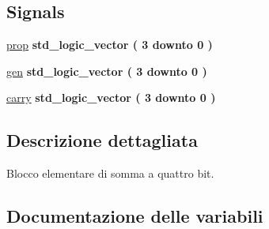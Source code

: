 \subsection*{Signals}
 \begin{DoxyCompactItemize}
\item 
\hyperlink{group___nibble_adder_ga3abd8d433ff039baabc0c6fc2126578b}{prop} {\bfseries \textcolor{vhdlchar}{std\+\_\+logic\+\_\+vector}\textcolor{vhdlchar}{ }\textcolor{vhdlchar}{(}\textcolor{vhdlchar}{ }\textcolor{vhdlchar}{ } \textcolor{vhdldigit}{3} \textcolor{vhdlchar}{ }\textcolor{vhdlchar}{downto}\textcolor{vhdlchar}{ }\textcolor{vhdlchar}{ } \textcolor{vhdldigit}{0} \textcolor{vhdlchar}{ }\textcolor{vhdlchar}{)}\textcolor{vhdlchar}{ }} 
\item 
\hyperlink{group___nibble_adder_gac6c069fe4ec1c0a42272d3de4be6f45f}{gen} {\bfseries \textcolor{vhdlchar}{std\+\_\+logic\+\_\+vector}\textcolor{vhdlchar}{ }\textcolor{vhdlchar}{(}\textcolor{vhdlchar}{ }\textcolor{vhdlchar}{ } \textcolor{vhdldigit}{3} \textcolor{vhdlchar}{ }\textcolor{vhdlchar}{downto}\textcolor{vhdlchar}{ }\textcolor{vhdlchar}{ } \textcolor{vhdldigit}{0} \textcolor{vhdlchar}{ }\textcolor{vhdlchar}{)}\textcolor{vhdlchar}{ }} 
\item 
\hyperlink{group___nibble_adder_ga8f5524d80e551d479327a16bb32abcaa}{carry} {\bfseries \textcolor{vhdlchar}{std\+\_\+logic\+\_\+vector}\textcolor{vhdlchar}{ }\textcolor{vhdlchar}{(}\textcolor{vhdlchar}{ }\textcolor{vhdlchar}{ } \textcolor{vhdldigit}{3} \textcolor{vhdlchar}{ }\textcolor{vhdlchar}{downto}\textcolor{vhdlchar}{ }\textcolor{vhdlchar}{ } \textcolor{vhdldigit}{0} \textcolor{vhdlchar}{ }\textcolor{vhdlchar}{)}\textcolor{vhdlchar}{ }} 
\end{DoxyCompactItemize}


\subsection{Descrizione dettagliata}
Blocco elementare di somma a quattro bit. 



\subsection{Documentazione delle variabili}
